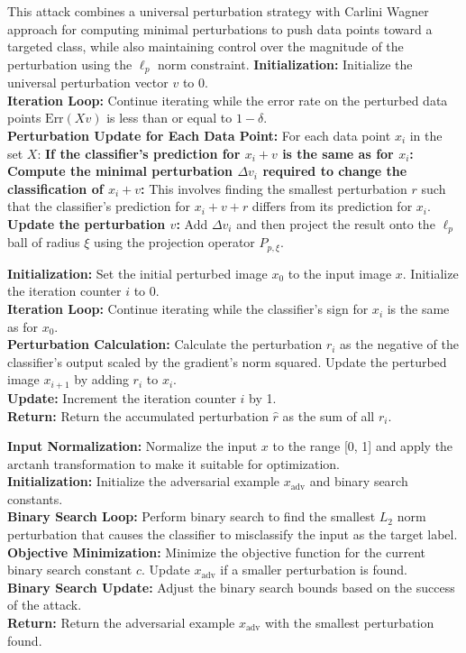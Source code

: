 This attack combines a universal perturbation strategy with Carlini Wagner approach for computing minimal perturbations to push data points toward a targeted class, while also maintaining control over the magnitude of the perturbation using the $\ell_p$ norm constraint.
\textbf{Initialization:} Initialize the universal perturbation vector $v$ to 0.\\
\textbf{Iteration Loop:} Continue iterating while the error rate on the perturbed data points $\text{Err}(Xv)$ is less than or equal to $1 - \delta$.\\
\textbf{Perturbation Update for Each Data Point:} For each data point $x_i$ in the set $X$: 
\textbf{If the classifier's prediction for $x_i + v$ is the same as for $x_i$:} 
\textbf{Compute the minimal perturbation $\Delta v_i$ required to change the classification of $x_i + v$:} This involves finding the smallest perturbation $r$ such that the classifier's prediction for $x_i + v + r$ differs from its prediction for $x_i$. 
\textbf{Update the perturbation $v$:} Add $\Delta v_i$ and then project the result onto the $\ell_p$ ball of radius $\xi$ using the projection operator $P_{p, \xi}$.


\textbf{Initialization:} Set the initial perturbed image $x_0$ to the input image $x$. Initialize the iteration counter $i$ to 0.\\
\textbf{Iteration Loop:} Continue iterating while the classifier's sign for $x_i$ is the same as for $x_0$.\\
\textbf{Perturbation Calculation:} Calculate the perturbation $r_i$ as the negative of the classifier's output scaled by the gradient's norm squared. Update the perturbed image $x_{i+1}$ by adding $r_i$ to $x_i$.\\
\textbf{Update:} Increment the iteration counter $i$ by 1.\\
\textbf{Return:} Return the accumulated perturbation $\hat{r}$ as the sum of all $r_i$.


\textbf{Input Normalization:} Normalize the input $x$ to the range [0, 1] and apply the $\text{arctanh}$ transformation to make it suitable for optimization.\\
\textbf{Initialization:} Initialize the adversarial example $x_{\text{adv}}$ and binary search constants.\\
\textbf{Binary Search Loop:} Perform binary search to find the smallest $L_2$ norm perturbation that causes the classifier to misclassify the input as the target label.\\
\textbf{Objective Minimization:} Minimize the objective function for the current binary search constant $c$. Update $x_{\text{adv}}$ if a smaller perturbation is found.\\
\textbf{Binary Search Update:} Adjust the binary search bounds based on the success of the attack.\\
\textbf{Return:} Return the adversarial example $x_{\text{adv}}$ with the smallest perturbation found.
